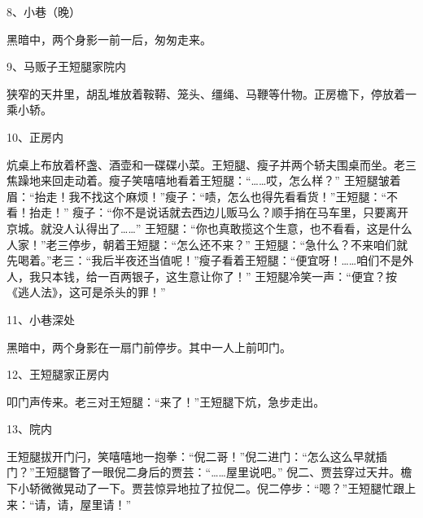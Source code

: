 8、小巷（晚）\par
黑暗中，两个身影一前一后，匆匆走来。

9、马贩子王短腿家院内\par
狭窄的天井里，胡乱堆放着鞍鞯、笼头、缰绳、马鞭等什物。正房檐下，停放着一乘小轿。

10、正房内\par
炕桌上布放着杯盏、酒壶和一碟碟小菜。王短腿、瘦子并两个轿夫围桌而坐。老三焦躁地来回走动着。瘦子笑嘻嘻地看着王短腿：“……哎，怎么样？”
王短腿皱着眉：“抬走！我不找这个麻烦！”瘦子：“啧，怎么也得先看看货！”王短腿：“不看！抬走！”
瘦子：“你不是说话就去西边儿贩马么？顺手捎在马车里，只要离开京城。就没人认得出了……”
王短腿：“你也真敢揽这个生意，也不看看，这是什么人家！”老三停步，朝着王短腿：“怎么还不来？”
王短腿：“急什么？不来咱们就先喝着。”老三：“我后半夜还当值呢！”瘦子看着王短腿：“便宜呀！……咱们不是外人，我只本钱，给一百两银子，这生意让你了！”
王短腿冷笑一声：“便宜？按《逃人法》，这可是杀头的罪！”

11、小巷深处\par
黑暗中，两个身影在一扇门前停步。其中一人上前叩门。

12、王短腿家正房内\par
叩门声传来。老三对王短腿：“来了！”王短腿下炕，急步走出。

13、院内\par
王短腿拔开门闩，笑嘻嘻地一抱拳：“倪二哥！”倪二进门：“怎么这么早就插门？”王短腿瞥了一眼倪二身后的贾芸：“……屋里说吧。”
倪二、贾芸穿过天井。檐下小轿微微晃动了一下。贾芸惊异地拉了拉倪二。倪二停步：“嗯？”王短腿忙跟上来：“请，请，屋里请！”

